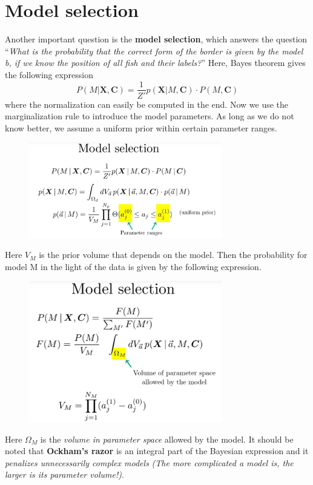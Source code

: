 \documentclass[12pt, a4paper]{scrartcl}
\begin{document}
\section*{Model selection}
Another important question is the \textbf{model selection}, which answers the question ``\textit{What is the
probability that the correct form of the border is given by the model b, if we
know the position of all fish and their labels?}'' Here, Bayes theorem gives the following expression 
\[P(M|\boldsymbol{X},\boldsymbol{C})=\frac{1}{Z'}p(\boldsymbol{X}|M,\boldsymbol{C}) \cdot P(M,\boldsymbol{C})\]
where the normalization can easily be computed in the end.
Now we use the marginalization rule to introduce the model parameters.
As long as we do not know better, we assume a uniform prior within certain
parameter ranges.\\%
\begin{figure}[H]
	\centering
	\includegraphics[width=0.75\textwidth]{7_18.png}
\end{figure}

Here $V_M$ is the prior volume that depends on the model.
Then the probability for model M in the light of the data is given by the following expression. %
\begin{figure}[H]
	\centering
	\includegraphics[width=0.75\textwidth]{7_19.png}
\end{figure}
Here $\Omega_M$ is the \textit{volume in parameter space} allowed by the model.
It should be noted that \textbf{Ockham's razor} is an integral part of the Bayesian expression 
and it \textit{penalizes unnecessarily complex models} \textit{(The more complicated a model is, the larger is its parameter volume!)}.\\
 
\end{document}
